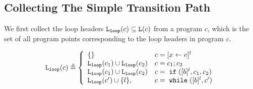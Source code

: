 \subsection{Collecting The Simple Transition Path}
We first collect the loop headers $\mathtt{L}_{\mathtt{loop}}(c) \subseteq \mathtt{L}(c)$ from a program $c$, which is the set of all program points corresponding to the loop headers in program $c$.
\begin{defn}
  \label{def:loopl}
  \[
  \loopl(c) \triangleq 
  \left\{
    \begin{array}{ll}
      \{\}  & {c} = [{\assign x e}]^{l} \\
      \loopl({c_1}) \cup \loopl({{c_2}})  & {c} = {c_1};{c_2} \\
      \loopl(c_1) \cup \loopl({{c_2}})   & {c} =\eif([\bexpr]^{l}, c_1, c_2) \\
  \loopl(c') \cup \{l\}, &  {c}   = \ewhile ([\bexpr]^{l}, {c}')
  \end{array}
\right.
\]
  \end{defn}

